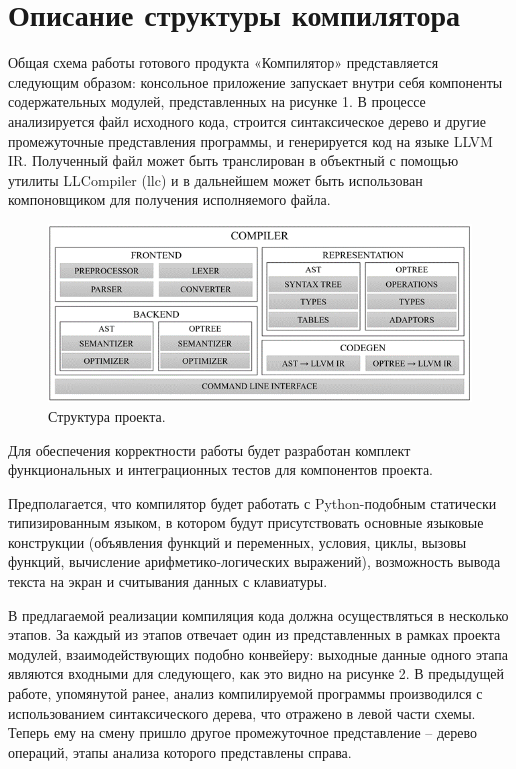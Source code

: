 \newpage
\section{Описание структуры компилятора}

Общая схема работы готового продукта «Компилятор» представляется следующим образом: консольное приложение запускает внутри себя компоненты содержательных модулей, представленных на рисунке 1. В процессе анализируется файл исходного кода, строится синтаксическое дерево и другие промежуточные представления программы, и генерируется код на языке LLVM IR. Полученный файл может быть транслирован в объектный с помощью утилиты LLCompiler (llc) и в дальнейшем может быть использован компоновщиком для получения исполняемого файла.

\begin{figure}[h]
    \centering
    \includegraphics[width=\textwidth]{images/project-structure.png}
    \caption{Структура проекта.}
\end{figure}

Для обеспечения корректности работы будет разработан комплект функциональных и интеграционных тестов для компонентов проекта.

Предполагается, что компилятор будет работать с Python-подобным статически типизированным языком, в котором будут присутствовать основные языковые конструкции (объявления функций и переменных, условия, циклы, вызовы функций, вычисление арифметико-логических выражений), возможность вывода текста на экран и считывания данных с клавиатуры.

В предлагаемой реализации компиляция кода должна осуществляться в несколько этапов. За каждый из этапов отвечает один из представленных в рамках проекта модулей, взаимодействующих подобно конвейеру: выходные данные одного этапа являются входными для следующего, как это видно на рисунке 2. В предыдущей работе, упомянутой ранее, анализ компилируемой программы производился с использованием синтаксического дерева, что отражено в левой части схемы. Теперь ему на смену пришло другое промежуточное представление – дерево операций, этапы анализа которого представлены справа.

